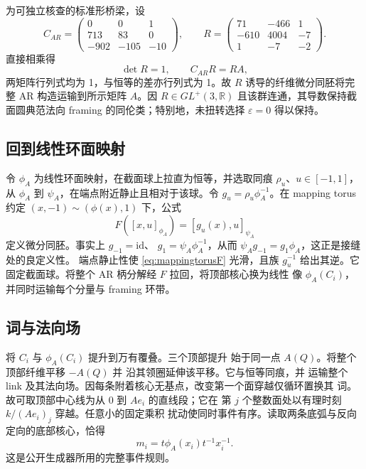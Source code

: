 为可独立核查的标准形桥梁，设
\[
C_{AR}=\begin{pmatrix}0&0&1\\713&83&0\\-902&-105&-10\end{pmatrix},
\qquad
R=\begin{pmatrix}71&-466&1\\-610&4004&-7\\1&-7&-2\end{pmatrix}.
\]
直接相乘得
\[
\det R=1,\qquad C_{AR}R=RA,
\]
两矩阵行列式均为 1，与恒等的差亦行列式为 1。故 $R$ 诱导的纤维微分同胚将完整 AR 构造运输到所示矩阵 $A$。因
$R\in GL^+(3,\mathbb R)$ 且该群连通，其导数保持截面圆典范法向 framing 的同伦类；特别地，未扭转选择 $\varepsilon=0$ 得以保持。

\subsection{回到线性环面映射}

令 $\phi_A$ 为线性环面映射，在截面球上拉直为恒等，并选取同痕 $\rho_u$、$u\in[-1,1]$，从 $\phi_A$ 到
$\psi_A$，在端点附近静止且相对于该球。令
$g_u=\rho_u\phi_A^{-1}$。在 mapping torus 约定
$(x,-1)\sim(\phi(x),1)$ 下，公式
\begin{equation}\label{eq:mappingtorusF}
F([x,u]_{\phi_A})=[g_u(x),u]_{\psi_A}
\end{equation}
定义微分同胚。事实上 $g_{-1}=\mathrm{id}$、
$g_1=\psi_A\phi_A^{-1}$，从而
$\psi_Ag_{-1}=g_1\phi_A$，这正是接缝处的良定义性。
端点静止性使 \eqref{eq:mappingtorusF} 光滑，且族
$g_u^{-1}$ 给出其逆。它固定截面球。将整个
AR 柄分解经 $F$ 拉回，将顶部核心换为线性
像 $\phi_A(C_i)$，并同时运输每个分量与 framing 环带。

\subsection{词与法向场}

将 $C_i$ 与 $\phi_A(C_i)$ 提升到万有覆叠。三个顶部提升
始于同一点 $A(Q)$。将整个顶部纤维平移 $-A(Q)$ 并
沿其领圈延伸该平移。它与恒等同痕，并
运输整个 link 及其法向场。因每条附着核心无基点，改变第一个面穿越仅循环置换其
词。故可取顶部中心线为从 $0$ 到 $Ae_i$ 的直线段；它在
第 $j$ 个整数面处以有理时刻 $k/(Ae_i)_j$ 穿越。任意小的固定乘积
扰动使同时事件有序。读取两条底弧与反向定向的底部核心，恰得
\begin{equation}\label{eq:actualword}
m_i=t\phi_A(x_i)t^{-1}x_i^{-1}.
\end{equation}
这是公开生成器所用的完整事件规则。

